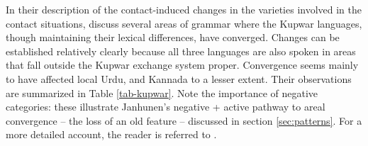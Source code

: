 \documentclass[output=paper,
modfonts
]{langscibook}
\begin{document}
\noindent In their description of the contact-induced changes in the varieties involved in the contact situations, \textcite{gumperzetal1971convergence} discuss several areas of grammar where the Kupwar languages, though maintaining their lexical differences, have converged. Changes can be established relatively clearly because all three languages are also spoken in areas that fall outside the Kupwar exchange system proper. Convergence seems mainly to have affected local Urdu, and Kannada to a lesser extent. Their observations are summarized in Table \ref{tab-kupwar}. Note the importance of negative categories: these illustrate Janhunen's \parencite*{janhunen2005} negative + active pathway to areal convergence -- the loss of an old feature -- discussed in section \ref{sec:patterns}. For a more detailed account, the reader is referred to \textcite{gumperzetal1971convergence}.
\end{document}
